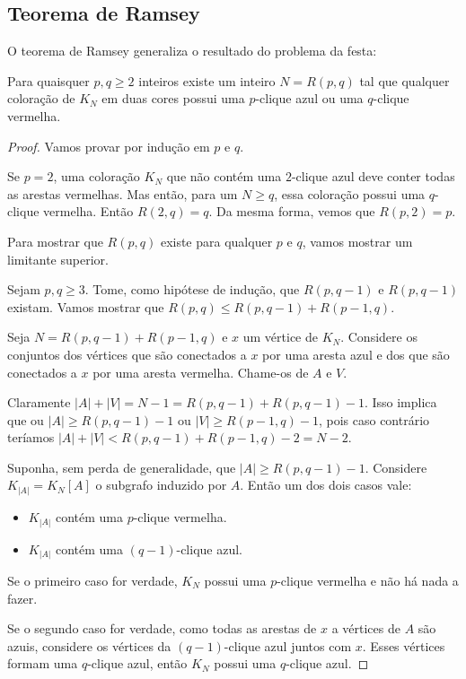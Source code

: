 \subsection {Teorema de Ramsey}
O teorema de Ramsey generaliza o resultado do problema da festa:

\begin{teorema}
    Para quaisquer $p,q\geq2$ inteiros existe um inteiro $N=R(p,q)$ tal que qualquer coloração de $K_N$ em duas cores possui uma $p$-clique azul ou uma $q$-clique vermelha.
\end{teorema}
\begin{proof}
    Vamos provar por indução em $p$ e $q$.

    Se $p=2$, uma coloração $K_N$ que não contém uma $2$-clique azul deve conter todas as arestas vermelhas. Mas então, para um $N\geq q$, essa coloração possui uma $q$-clique vermelha. Então $R(2,q)=q$. Da mesma forma, vemos que $R(p,2)=p$.

    Para mostrar que $R(p,q)$ existe para qualquer $p$ e $q$, vamos mostrar um limitante superior.

    Sejam $p,q\geq3$. Tome, como hipótese de indução, que $R(p,q-1)$ e $R(p,q-1)$ existam. Vamos mostrar que $R(p,q)\leq R(p,q-1)+R(p-1,q)$.

    Seja $N=R(p,q-1)+R(p-1,q)$ e $x$ um vértice de $K_N$. Considere os conjuntos dos vértices que são conectados a $x$ por uma aresta azul e dos que são conectados a $x$ por uma aresta vermelha. Chame-os de $A$ e $V$.

    Claramente $|A|+|V|=N-1=R(p,q-1)+R(p,q-1)-1$. Isso implica que ou $|A|\geq R(p,q-1)-1$ ou $|V|\geq R(p-1,q)-1$, pois caso contrário teríamos $|A|+|V|<R(p,q-1)+R(p-1,q)-2=N-2$.

    Suponha, sem perda de generalidade, que $|A|\geq R(p,q-1)-1$. Considere $K_{|A|}=K_N[A]$ o subgrafo induzido por $A$. Então um dos dois casos vale:
    \begin{itemize}
        \item $K_{|A|}$ contém uma $p$-clique vermelha.
        \item $K_{|A|}$ contém uma $(q-1)$-clique azul.
    \end{itemize}
    Se o primeiro caso for verdade, $K_N$ possui uma $p$-clique vermelha e não há nada a fazer.

    Se o segundo caso for verdade, como todas as arestas de $x$ a vértices de $A$ são azuis, considere os vértices da $(q-1)$-clique azul juntos com $x$. Esses vértices formam uma $q$-clique azul, então $K_N$ possui uma $q$-clique azul.
\end{proof}

